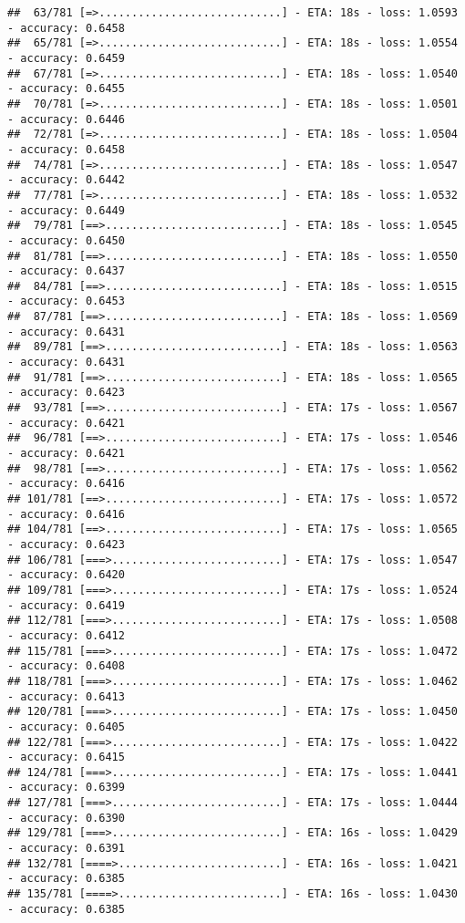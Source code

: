 \documentclass[
]{article}
\begin{document}
\begin{verbatim}
##  63/781 [=>............................] - ETA: 18s - loss: 1.0593 - accuracy: 0.6458
##  65/781 [=>............................] - ETA: 18s - loss: 1.0554 - accuracy: 0.6459
##  67/781 [=>............................] - ETA: 18s - loss: 1.0540 - accuracy: 0.6455
##  70/781 [=>............................] - ETA: 18s - loss: 1.0501 - accuracy: 0.6446
##  72/781 [=>............................] - ETA: 18s - loss: 1.0504 - accuracy: 0.6458
##  74/781 [=>............................] - ETA: 18s - loss: 1.0547 - accuracy: 0.6442
##  77/781 [=>............................] - ETA: 18s - loss: 1.0532 - accuracy: 0.6449
##  79/781 [==>...........................] - ETA: 18s - loss: 1.0545 - accuracy: 0.6450
##  81/781 [==>...........................] - ETA: 18s - loss: 1.0550 - accuracy: 0.6437
##  84/781 [==>...........................] - ETA: 18s - loss: 1.0515 - accuracy: 0.6453
##  87/781 [==>...........................] - ETA: 18s - loss: 1.0569 - accuracy: 0.6431
##  89/781 [==>...........................] - ETA: 18s - loss: 1.0563 - accuracy: 0.6431
##  91/781 [==>...........................] - ETA: 18s - loss: 1.0565 - accuracy: 0.6423
##  93/781 [==>...........................] - ETA: 17s - loss: 1.0567 - accuracy: 0.6421
##  96/781 [==>...........................] - ETA: 17s - loss: 1.0546 - accuracy: 0.6421
##  98/781 [==>...........................] - ETA: 17s - loss: 1.0562 - accuracy: 0.6416
## 101/781 [==>...........................] - ETA: 17s - loss: 1.0572 - accuracy: 0.6416
## 104/781 [==>...........................] - ETA: 17s - loss: 1.0565 - accuracy: 0.6423
## 106/781 [===>..........................] - ETA: 17s - loss: 1.0547 - accuracy: 0.6420
## 109/781 [===>..........................] - ETA: 17s - loss: 1.0524 - accuracy: 0.6419
## 112/781 [===>..........................] - ETA: 17s - loss: 1.0508 - accuracy: 0.6412
## 115/781 [===>..........................] - ETA: 17s - loss: 1.0472 - accuracy: 0.6408
## 118/781 [===>..........................] - ETA: 17s - loss: 1.0462 - accuracy: 0.6413
## 120/781 [===>..........................] - ETA: 17s - loss: 1.0450 - accuracy: 0.6405
## 122/781 [===>..........................] - ETA: 17s - loss: 1.0422 - accuracy: 0.6415
## 124/781 [===>..........................] - ETA: 17s - loss: 1.0441 - accuracy: 0.6399
## 127/781 [===>..........................] - ETA: 17s - loss: 1.0444 - accuracy: 0.6390
## 129/781 [===>..........................] - ETA: 16s - loss: 1.0429 - accuracy: 0.6391
## 132/781 [====>.........................] - ETA: 16s - loss: 1.0421 - accuracy: 0.6385
## 135/781 [====>.........................] - ETA: 16s - loss: 1.0430 - accuracy: 0.6385

\end{verbatim}
\end{document}
